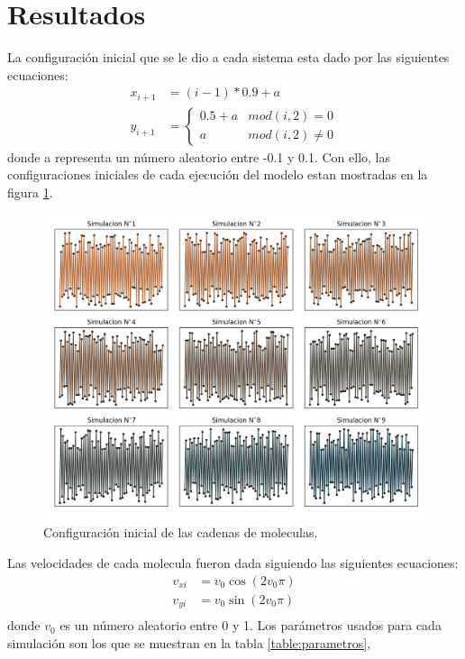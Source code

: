 \section{Resultados}
La configuración inicial que se le dio a cada sistema esta dado por las siguientes ecuaciones:
\begin{align*}
    x_{i+1}&=(i-1)*0.9+a\\
    y_{i+1}&=\left\lbrace\begin{matrix}
        0.5+a & mod(i,2)=0 \\
        a & mod(i,2)\neq 0
    \end{matrix} \right.
\end{align*}
donde a representa un número aleatorio entre -0.1 y 0.1. Con ello, las configuraciones iniciales de cada ejecución del modelo estan
mostradas en la figura \ref{fig:posini}.
\begin{figure}[H]
    \centering
    \includegraphics[scale=0.27]{../Graphics/pos_ini.png}
    \caption{Configuración inicial de las cadenas de moleculas.}
    \label{fig:posini}
\end{figure}
Las velocidades de cada molecula fueron dada siguiendo las siguientes ecuaciones:
\begin{align*}
    v_{xi}&=v_{0}\cos(2v_0\pi)\\
    v_{yi}&=v_{0}\sin(2v_0\pi)\\
\end{align*}
donde $v_0$ es un número aleatorio entre 0 y 1. Los parámetros usados para cada simulación son los que se muestran en la tabla \ref{table:parametros},
